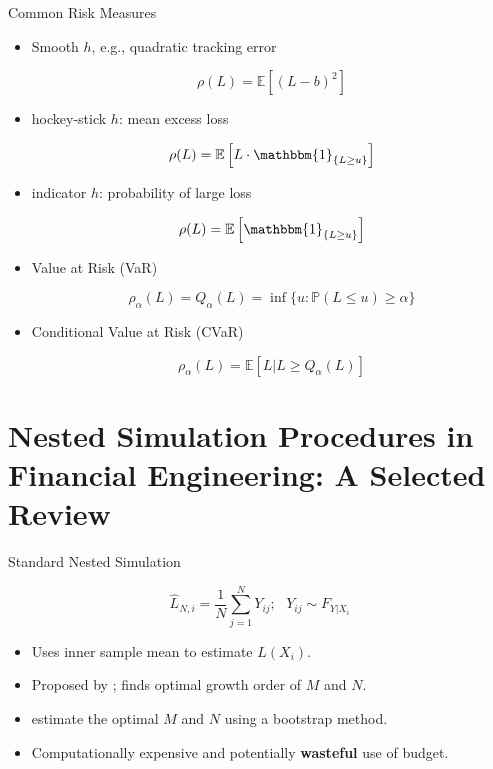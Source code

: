 \documentclass[9pt,handout]{beamer}
\begin{document}
\begin{frame}{Common Risk Measures}

\begin{itemize}
    \item Smooth $h$, e.g., quadratic tracking error

    $$ \rho(L) = \mathbb{E} \left[ (L - b)^2 \right] $$
    
    \item hockey-stick $h$: mean excess loss
    
    $$ \rho(L) = \mathbb{E} \left[ L \cdot \mathbbm{1}_{\{L \geq u\}} \right] $$
    
    \item indicator $h$: probability of large loss
    
    $$ \rho(L) = \mathbb{E} \left[ \mathbbm{1}_{\{L \geq u\}} \right] $$
    
    \item Value at Risk (VaR)
    
    $$ \rho_\alpha(L) = Q_\alpha(L) = \inf \{ u: \mathbb{P}(L \leq u) \geq \alpha \} $$
    
    \item Conditional Value at Risk (CVaR) \footnotemark
    
    $$ \rho_\alpha(L) = \mathbb{E} \left[ L \vert L \geq Q_\alpha(L) \right] $$

    \end{itemize}


\end{frame}

\section{Nested Simulation Procedures in Financial Engineering: A Selected Review}

\begin{frame}{Standard Nested Simulation}

$$\hat{L}_{N, i} = \frac{1}{N} \sum_{j=1}^N Y_{ij}; ~~~ Y_{ij} \sim F_{Y|X_i} $$

\begin{itemize}
    \item Uses inner sample mean to estimate $L(X_i)$.
    \item Proposed by \citet{gordy2010nested}; finds optimal growth order of $M$ and $N$.
    \item \citet{zhang2021bootstrap} estimate the optimal $M$ and $N$ using a bootstrap method.
    \item Computationally expensive and potentially \textbf{wasteful} use of budget.
\end{itemize}

\end{frame}
\end{document}
